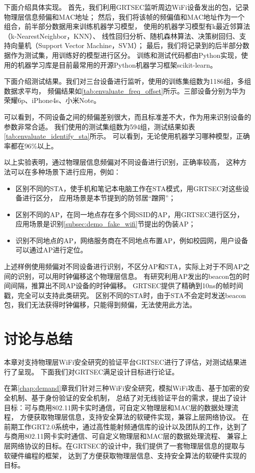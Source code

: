 		下面介绍具体实现。
    首先，我们利用GRTSEC监听周边WiFi设备发出的包，记录物理层信息频偏和MAC地址；
		然后，我们将该帧的频偏值和MAC地址作为一个组合，前半部分数据用来训练机器学习模型，
    使用的机器学习模型有k最近邻算法（k-NearestNeighbor，KNN）、
    线性回归分析、随机森林算法、决策树回归、支持向量机（Support Vector Machine，SVM）；
		最后，我们将记录到的后半部分数据作为测试集，用训练好的模型进行区分。
		训练和测试代码都由Python实现，使用的机器学习库是目前最常用的开源Python机器学习框架scikit-learn\cite{sklearn}。

    下面介绍测试结果。我们对三台设备进行监听，使用的训练集组数为1186组，多组数据求平均，
    频偏结果如\ref{tab:envaluate_freq_offset}所示。三部设备分别为华为荣耀6p、iPhone4s、小米Note。

    可以看到，不同设备之间的频偏差别很大，而且标准差不大，作为用来识别设备的参数非常合适。
    我们使用的测试集组数为594组，测试结果如表\ref{tab:envaluate_identify_sta}所示。
    可以看到，无论使用机器学习哪种模型，正确率都在96\%以上。

    以上实验表明，通过物理层信息频偏对不同设备进行识别，正确率较高，
    这种方法可以在多种场景下进行应用，例如：
			\begin{itemize}
				\item 区别不同的STA，使手机和笔记本电脑工作在STA模式，用GRTSEC对这些设备进行区分，
				应用场景是本节提到的防邻居“蹭网”；
				\item 区别不同的AP，在同一地点存在多个同SSID的AP，用GRTSEC进行区分，
				应用场景是识别\ref{subsec:demo_fake_wifi}节提出的伪装AP；
				\item 识别不同地点的AP，网络服务商在不同地点布置AP，例如校园网，用户设备可以通过AP进行定位。
			\end{itemize}

    上述样例使用频偏对不同设备进行识别，不区分AP和STA，实际上对于不同AP之间的识别，可以用时钟偏移这个物理层信息。
    有研究利用AP发出的beacon包的时间间隔，推算出不同AP设备的时钟偏移\cite{tmc10clock}。
    GRTSEC提供了精确到10ns的帧时间戳，完全可以支持此类研究。
		区别不同的STA时，由于STA不会定时发送beacon包，我们无法获得时钟偏移，只能得到频偏，无法使用此方法。

  \section{讨论与总结}\label{sec:envaluation_summary}
  本章对支持物理层WiFi安全研究的验证平台GRTSEC进行了评估，对测试结果进行了呈现。
  下面我们对GRTSEC满足设计目标进行论证。

  在第\ref{chap:demand}章我们针对三种WiFi安全研究，模拟WiFi攻击、基于加密的安全机制、基于身份验证的安全机制，
  总结了对无线验证平台的需求，提出了设计目标：可与商用802.11网卡实时通信，可自定义物理层和MAC层的数据处理流程，
  方便获取物理层信息，支持安全算法的软硬件实现，兼容上层网络协议。
  在前期工作GRT2.0系统中，通过高性能射频通信库的设计以及团队的工作，达到了与商用802.11网卡实时通信、可自定义物理层和MAC层的数据处理流程、
  兼容上层网络协议的目标。在GRTSEC的设计中，我们提供了一套物理层信息的提取与软硬件编程的框架，
  达到了方便获取物理层信息、支持安全算法的软硬件实现的目标。

